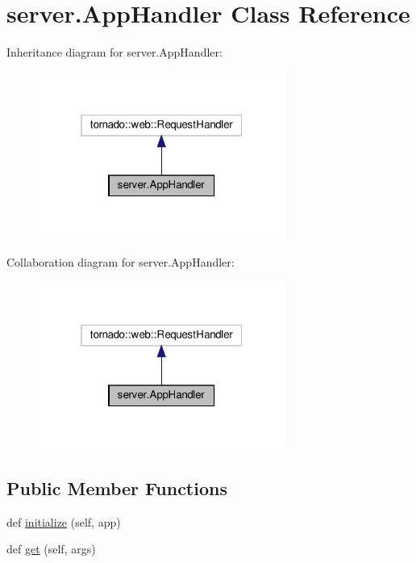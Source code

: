 \hypertarget{classserver_1_1AppHandler}{}\section{server.\+App\+Handler Class Reference}
\label{classserver_1_1AppHandler}


Inheritance diagram for server.\+App\+Handler\+:
\nopagebreak
\begin{figure}[H]
\begin{center}
\leavevmode
\includegraphics[width=229pt]{classserver_1_1AppHandler__inherit__graph}
\end{center}
\end{figure}


Collaboration diagram for server.\+App\+Handler\+:
\nopagebreak
\begin{figure}[H]
\begin{center}
\leavevmode
\includegraphics[width=229pt]{classserver_1_1AppHandler__coll__graph}
\end{center}
\end{figure}
\subsection*{Public Member Functions}
\begin{DoxyCompactItemize}
\item 
def \hyperlink{classserver_1_1AppHandler_a0d57a095eee7c98835d9656fdfb70d2d}{initialize} (self, app)
\item 
def \hyperlink{classserver_1_1AppHandler_a3e2f211ff577b8b4173e0d944c62d87f}{get} (self, args)
\end{DoxyCompactItemize}
